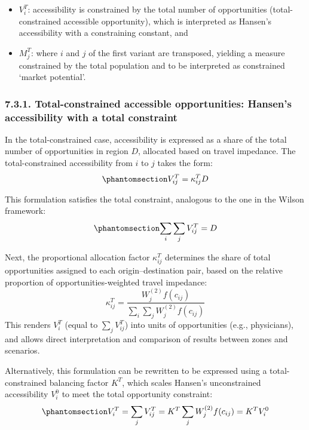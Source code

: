 \documentclass[
  10pt,
  letterpaper,
]{article}
\providecommand{\tightlist}{%
  \setlength{\itemsep}{0pt}\setlength{\parskip}{0pt}}
\begin{document}
\begin{itemize}
\tightlist
\item
  \(V_i^T\): accessibility is constrained by the total number of
  opportunities (total-constrained accessible opportunity), which is
  interpreted as Hansen's accessibility with a constraining constant,
  and
\item
  \(M_j^T\): where \(i\) and \(j\) of the first variant are transposed,
  yielding a measure constrained by the total population and to be
  interpreted as constrained `market potential'.
\end{itemize}

\subsubsection{7.3.1. Total-constrained accessible opportunities:
Hansen's accessibility with a total
constraint}\label{total-constrained-accessible-opportunities-hansens-accessibility-with-a-total-constraint}

In the total-constrained case, accessibility is expressed as a share of
the total number of opportunities in region \(D\), allocated based on
travel impedance. The total-constrained accessibility from \(i\) to
\(j\) takes the form:
\begin{equation}\phantomsection\label{eq-total-constrained-access}{
V^T_{ij} = \kappa_{ij}^T D
}\end{equation}

This formulation satisfies the total constraint, analogous to the one in
the Wilson framework:
\begin{equation}\phantomsection\label{eq-total-constraint-D}{
\sum_i \sum_j V^T_{ij} =  D
}\end{equation}

Next, the proportional allocation factor \(\kappa_{ij}^T\) determines
the share of total opportunities assigned to each origin--destination
pair, based on the relative proportion of opportunities-weighted travel
impedance: \[
\kappa_{ij}^T = \frac{W^{(2)}_j f(c_{ij})}{\sum_i\sum_j W^{(2)}_jf(c_{ij})}
\] This renders \(V_i^T\) (equal to \(\sum_jV_{ij}^T\)) into units of
opportunities (e.g., physicians), and allows direct interpretation and
comparison of results between zones and scenarios.

Alternatively, this formulation can be rewritten to be expressed using a
total-constrained balancing factor \(K^T\), which scales Hansen's
unconstrained accessibility \(V_i^0\) to meet the total opportunity
constraint:
\begin{equation}\phantomsection\label{eq-total-constrained-accessibility}{
V^T_i = \sum_j V^T_{ij} = K^T \sum_j W^{(2)}_jf(c_{ij}) = K^T  V^0_i
}\end{equation}
\end{document}
